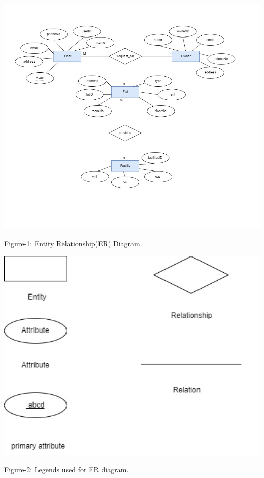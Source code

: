 \begin{enumerate}
    

\includegraphics[width=1\textwidth,inner]{images/_erd.drawio.jpg}\\
\begin{center}
    Figure-1: Entity Relationship(ER) Diagram.
\end{center}
 
\includegraphics[width=1\textwidth,inner]{images/_ Legends used for ER diagram01.drawio.jpg}\\
 \begin{center}
    Figure-2: Legends used for ER diagram.
\end{center}


 \end{enumerate}    
